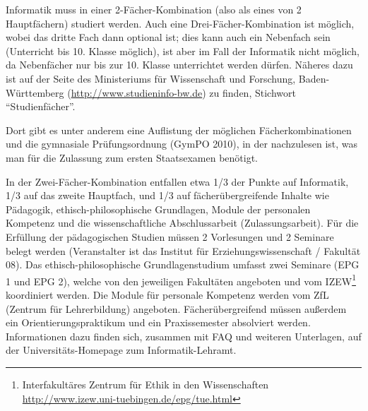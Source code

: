 
Informatik muss in einer 2-Fächer-Kombination (also als eines von 2 Hauptfächern) studiert werden. Auch eine Drei-Fächer-Kombination ist möglich, wobei das dritte Fach dann optional ist; dies kann auch ein Nebenfach sein (Unterricht bis 10. Klasse möglich), ist aber im Fall der Informatik nicht möglich, da Nebenfächer nur bis zur 10. Klasse unterrichtet werden dürfen. Näheres dazu ist auf der Seite des Ministeriums für Wissenschaft und Forschung, Baden-Württemberg (\url{http://www.studieninfo-bw.de}) zu finden, Stichwort "`Studienfächer"'.

Dort gibt es unter anderem eine Auflistung der möglichen Fächer\-kom\-bi\-na\-tio\-nen und die gymnasiale Prüfungsordnung (GymPO 2010), in der nachzulesen ist, was man für die Zulassung zum ersten Staatsexamen benötigt.

In der Zwei-Fächer-Kombination entfallen etwa 1/3 der Punkte auf Informatik, 1/3 auf das zweite Hauptfach, und 1/3 auf fächerübergreifende Inhalte wie Pädagogik, ethisch-philosophische Grundlagen, Module der personalen Kompetenz und die wissenschaftliche Abschlussarbeit (Zulassungsarbeit).
Für die Erfüllung der pädagogischen Studien müssen 2 Vorlesungen und 2 Seminare belegt werden (Veranstalter ist das Institut für Erziehungswissenschaft / Fakultät 08). Das ethisch-philosophische Grundlagenstudium umfasst zwei Seminare (EPG 1 und EPG 2), welche von den jeweiligen Fakultäten angeboten und vom IZEW\footnote{Interfakultäres Zentrum für Ethik in den Wissenschaften \url{http://www.izew.uni-tuebingen.de/epg/tue.html}} koordiniert  werden.
Die Module für personale Kompetenz werden vom ZfL (Zentrum für Lehrerbildung) angeboten.
Fächerübergreifend müssen außerdem ein Orientierungspraktikum und ein Praxissemester absolviert werden. Informationen dazu finden sich, zusammen mit FAQ und weiteren Unterlagen, auf der Universitäts-Homepage zum Informatik-Lehramt.
